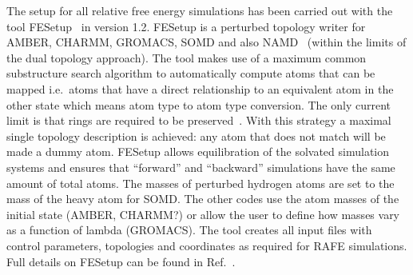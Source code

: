 \documentclass[journal=jctcce,manuscript=article]{achemso}
\begin{document}
The setup for all relative free energy simulations has been carried
out with the tool FESetup~\cite{loeffler_fesetup:_2015} in version
1.2.  FESetup is a perturbed topology writer for AMBER, CHARMM,
GROMACS, SOMD and also NAMD~\cite{JCC:JCC20289} (within the
limits of the dual topology approach).  The tool makes use of a
maximum common substructure search algorithm to automatically compute
atoms that can be mapped i.e.\ atoms that have a direct relationship
to an equivalent atom in the other state which means atom type to
atom type conversion.  The only current limit is that rings are
required to be preserved~\cite{doi:10.1021/acs.jcim.5b00057}.  With this
strategy a maximal single topology description is achieved: any atom that
does not match will be made a dummy atom.  FESetup allows
equilibration of the solvated simulation systems and ensures that
``forward'' and ``backward'' simulations have the same amount of
total atoms.  The masses of perturbed hydrogen atoms are set to the mass of the heavy atom for SOMD.  The other codes use the atom masses of the initial state (AMBER, CHARMM?) or allow the user to define how masses vary as a function of lambda (GROMACS).
The tool creates all input files with control
parameters, topologies and coordinates as required for RAFE
simulations.  Full details on FESetup can be found in
Ref.~.
\end{document}
